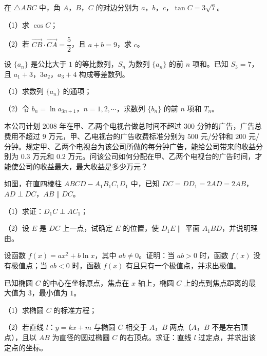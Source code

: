 \begin{question}
在 $\triangle ABC$ 中，角 $A$，$B$，$C$ 的对边分别为 $a$，$b$，$c$，$\tan C=3\sqrt7$。

（1）求 $\cos C$；

（2）若 $\overrightarrow{CB}\cdot\overrightarrow{CA}=\dfrac52$，且 $a+b=9$，求 $c$。

\end{question}
\begin{question}
设 $\{a_n\}$ 是公比大于 $1$ 的等比数列，$S_n$ 为数列 $\{a_n\}$ 的前 $n$ 项和。已知 $S_3=7$，且 $a_1+3$，$3a_2$，$a_3+4$ 构成等差数列。

（1）求数列 $\{a_n\}$ 的通项；

（2）令 $b_n=\ln a_{3n+1}$，$n=1,2,\cdots$，求数列 $\{b_n\}$ 的前 $n$ 项和 $T_n$。

\end{question}
\begin{question}
本公司计划 $2008$ 年在甲、乙两个电视台做总时间不超过 $300$ 分钟的广告，广告总费用不超过 $9$ 万元，甲、乙电视台的广告收费标准分别为 $500$ 元/分钟和 $200$ 元/分钟。规定甲、乙两个电视台为该公司所做的每分钟广告，能给公司带来的收益分别为 $0.3$ 万元和 $0.2$ 万元。问该公司如何分配在甲、乙两个电视台的广告时间，才能使公司的收益最大，最大收益是多少万元？

\Needspace{0.4\textheight}
\end{question}
\begin{question}
如图，在直四棱柱 $ABCD-A_1B_1C_1D_1$ 中，已知 $DC=DD_1=2AD=2AB$，$AD\perp DC$，$AB\parallel DC$。

（1）求证：$D_1C\perp AC_1$；

（2）设 $E$ 是 $DC$ 上一点，试确定 $E$ 的位置，使 $D_1E\parallel$ 平面 $A_1BD$，并说明理由。
\nopagebreak[4]
\begin{center}\end{center}
\nopagebreak[4]
\end{question}
\begin{question}
设函数 $f(x)=ax^2+b\ln x$，其中 $ab\neq0$。证明：当 $ab>0$ 时，函数 $f(x)$ 没有极值点；当 $ab<0$ 时，函数 $f(x)$ 有且只有一个极值点，并求出极值。

\end{question}
\begin{question}
已知椭圆 $C$ 的中心在坐标原点，焦点在 $x$ 轴上，椭圆 $C$ 上的点到焦点距离的最大值为 $3$，最小值为 $1$。

（1）求椭圆 $C$ 的标准方程；

（2）若直线 $l$：$y=kx+m$ 与椭圆 $C$ 相交于 $A$，$B$ 两点（$A$，$B$ 不是左右顶点），且以 $AB$ 为直径的圆过椭圆 $C$ 的右顶点。求证：直线 $l$ 过定点，并求出该定点的坐标。

\end{question}